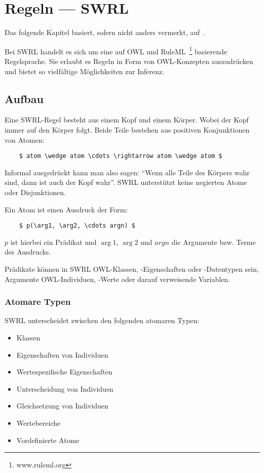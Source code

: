 \chapter{Regeln --- SWRL}
\label{chap:swrl}

Das folgende Kapitel basiert, sofern nicht anders vermerkt, auf~\cite{swrl}.

Bei SWRL handelt es sich um eine auf OWL und RuleML~\footnote{www.ruleml.org} basierende Regelsprache. Sie erlaubt es Regeln in Form von OWL-Konzepten auszudrücken und bietet so vielfältige Möglichkeiten zur Inferenz.

\section{Aufbau}
\label{sec:swrl_aufbau}
Eine SWRL-Regel besteht aus einem Kopf und einem Körper. Wobei der Kopf immer auf den Körper folgt. Beide Teile bestehen aus positiven Konjunktionen von Atomen:
\lstset{language=XML}
\begin{lstlisting}
    $ atom \wedge atom \cdots \rightarrow atom \wedge atom $
\end{lstlisting}

Informal ausgedrückt kann man also sagen: ``Wenn alle Teile des Körpers wahr sind, dann ist auch der Kopf wahr''. SWRL unterstützt keine negierten Atome oder Disjunktionen.

Ein Atom ist einen Ausdruck der Form:
\lstset{language=XML}
\begin{lstlisting}
    $ p(\arg1, \arg2, \cdots argn) $
\end{lstlisting}
$p$ ist hierbei ein Prädikat und $\arg1$, $\arg2$ und $argn$ die Argumente bzw. Terme des Ausdrucks.

Prädikate können in SWRL OWL-Klassen, -Eigenschaften oder -Datentypen sein, Argumente OWL-Individuen, -Werte oder darauf verweisende Variablen.

\subsection{Atomare Typen}
\label{subsec:swrl_aufbau_atomaretypen}
SWRL unterscheidet zwischen den folgenden atomaren Typen:
\begin{itemize}
    \item Klassen
    \item Eigenschaften von Individuen
    \item Wertespezifische Eigenschaften
    \item Unterscheidung von Individuen
    \item Gleichsetzung von Individuen
    \item Wertebereiche
    \item Vordefinierte Atome
\end{itemize}

